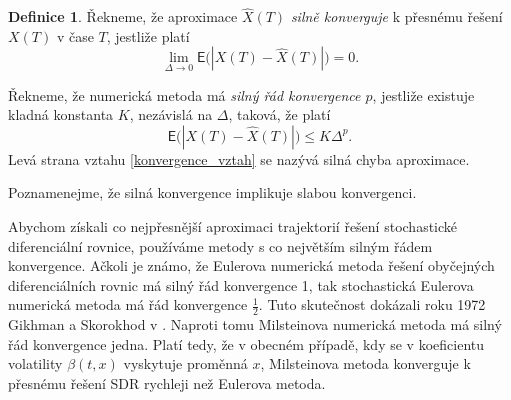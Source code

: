 \documentclass[a4paper,12pt]{report}
\theoremstyle{definition} \newtheorem{definice}[veta]{Definice}
\theoremstyle{remark}
\begin{document}
\begin{definice}\label{konvergence_def}
Řekneme, že aproximace $\hat X(T)$ \textit{silně konverguje} k přesnému řešení $X(T)$ v čase $T$, jestliže platí
\begin{equation}
\lim_{\Delta\to0}\mathsf{E}\big(|X(T)-\hat X(T)|\big)=0.
\end{equation}

Řekneme, že numerická metoda má \textit{silný řád konvergence $p$}, jestliže existuje kladná konstanta $K$, nezávislá na $\Delta$, taková, že platí
\begin{equation}\label{konvergence_vztah}
\mathsf{E}\big(|X(T)-\hat X(T)|\big)\leq K\Delta^p.
\end{equation}
Levá strana vztahu \eqref{konvergence_vztah} se nazývá silná chyba aproximace.
\end{definice}
Poznamenejme, že silná konvergence implikuje slabou konvergenci.

Abychom získali co nejpřesnější aproximaci trajektorií řešení stochastické diferenciální rovnice, používáme metody s co největším silným řádem konvergence.
Ačkoli je známo, že Eulerova numerická metoda řešení obyčejných diferenciálních rovnic má silný řád konvergence 1, 
tak stochastická Eulerova numerická metoda má řád konvergence $\frac12$.
Tuto skutečnost dokázali roku 1972 Gikhman a Skorokhod v \cite{gikhman1972stochastic}.
Naproti tomu Milsteinova numerická metoda má silný řád konvergence jedna.
Platí tedy, že v obecném případě, kdy se v koeficientu volatility $\beta(t,x)$ vyskytuje proměnná $x$, Milsteinova metoda konverguje k přesnému řešení SDR rychleji než Eulerova metoda. %
\end{document}

